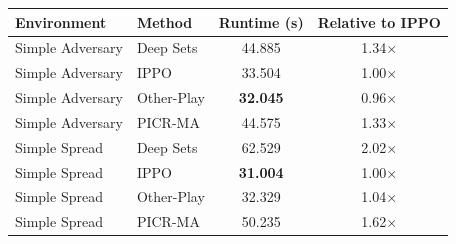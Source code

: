 \begin{tabular}{llcc}
\toprule
Environment & Method & Runtime (s) & Relative to IPPO \\
\midrule
Simple Adversary & Deep Sets & 44.885 & 1.34$\times$ \\
Simple Adversary & IPPO & 33.504 & 1.00$\times$ \\
Simple Adversary & Other-Play & \textbf{32.045} & 0.96$\times$ \\
Simple Adversary & PICR-MA & 44.575 & 1.33$\times$ \\
Simple Spread & Deep Sets & 62.529 & 2.02$\times$ \\
Simple Spread & IPPO & \textbf{31.004} & 1.00$\times$ \\
Simple Spread & Other-Play & 32.329 & 1.04$\times$ \\
Simple Spread & PICR-MA & 50.235 & 1.62$\times$ \\
\bottomrule
\end{tabular}
